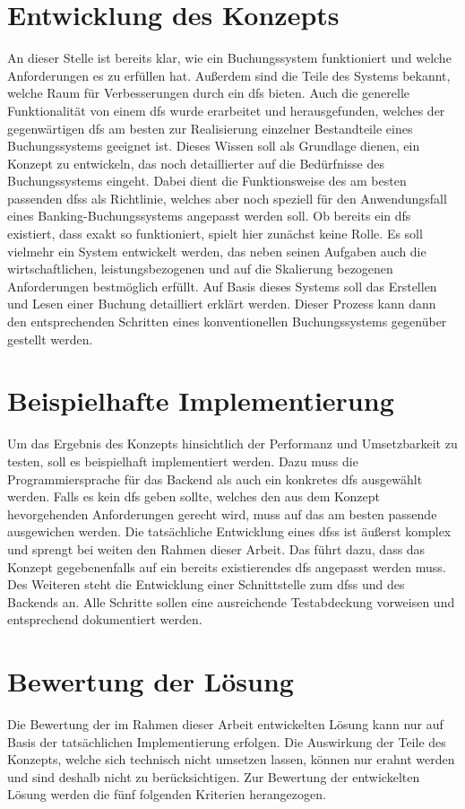\documentclass[12pt,oneside,a4paper,parskip]{scrbook}
\begin{document}
\section{Entwicklung des Konzepts}
An dieser Stelle ist bereits klar, wie ein Buchungssystem funktioniert und welche Anforderungen es zu erfüllen hat. Außerdem sind die Teile des Systems bekannt, welche Raum für Verbesserungen durch ein \ac{dfs} bieten. Auch die generelle Funktionalität von einem \ac{dfs} wurde erarbeitet und herausgefunden, welches der gegenwärtigen \ac{dfs} am besten zur Realisierung einzelner Bestandteile eines Buchungssystems geeignet ist. Dieses Wissen soll als Grundlage dienen, ein Konzept zu entwickeln, das noch detaillierter auf die Bedürfnisse des Buchungssystems eingeht. Dabei dient die Funktionsweise des am besten passenden \acp{dfs} als Richtlinie, welches aber noch speziell für den Anwendungsfall eines Banking-Buchungssystems angepasst werden soll. Ob bereits ein \ac{dfs} existiert, dass exakt so funktioniert, spielt hier zunächst keine Rolle. Es soll vielmehr ein System entwickelt werden, das neben seinen Aufgaben auch die wirtschaftlichen, leistungsbezogenen und auf die Skalierung bezogenen Anforderungen bestmöglich erfüllt. Auf Basis dieses Systems soll das Erstellen und Lesen einer Buchung detailliert erklärt werden. Dieser Prozess kann dann den entsprechenden Schritten eines konventionellen Buchungssystems gegenüber gestellt werden.

\section{Beispielhafte Implementierung}
Um das Ergebnis des Konzepts hinsichtlich der Performanz und Umsetzbarkeit zu testen, soll es beispielhaft implementiert werden.
Dazu muss die Programmiersprache für das Backend als auch ein konkretes \ac{dfs} ausgewählt werden. Falls es kein \ac{dfs} geben sollte, welches den aus dem Konzept hevorgehenden Anforderungen gerecht wird, muss auf das am besten passende ausgewichen werden. Die tatsächliche Entwicklung eines \acp{dfs} ist äußerst komplex und sprengt bei weiten den Rahmen dieser Arbeit. Das führt dazu, dass das Konzept gegebenenfalls auf ein bereits existierendes \ac{dfs} angepasst werden muss. Des Weiteren steht die Entwicklung einer Schnittstelle zum \acp{dfs} und des Backends an. Alle Schritte sollen eine ausreichende Testabdeckung vorweisen und entsprechend dokumentiert werden.

\section{Bewertung der Lösung}
Die Bewertung der im Rahmen dieser Arbeit entwickelten Lösung kann nur auf Basis der tatsächlichen Implementierung erfolgen. Die Auswirkung der Teile des Konzepts, welche sich technisch nicht umsetzen lassen, können nur erahnt werden und sind deshalb nicht zu berücksichtigen. Zur Bewertung der entwickelten Lösung werden die fünf folgenden Kriterien herangezogen.
\end{document}
